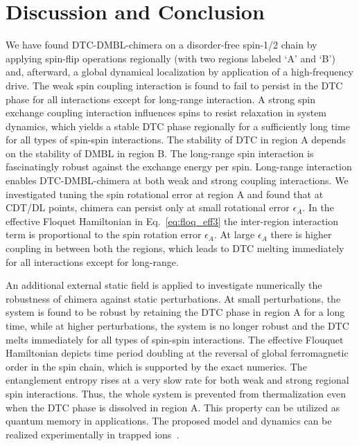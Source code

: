 \documentclass[%
nofootinbib,
reprint,
superscriptaddress,
amsmath,amssymb,showkeys,
aps,
prb,
]{revtex4-2}
\begin{document}
	
	\section{\label{sec:level7} Discussion and Conclusion}
	
	We have found DTC-DMBL-chimera on a  disorder-free spin-1/2 chain by applying spin-flip operations regionally (with two regions labeled `A' and `B') and, afterward, a global dynamical localization by application of  a high-frequency drive. The weak spin coupling interaction is found to fail to persist in the DTC phase for all interactions except for long-range interaction. A strong spin exchange coupling interaction influences spins to resist relaxation in system dynamics, which yields a stable DTC phase regionally for a sufficiently long time for all types of spin-spin interactions. The stability of DTC in region A depends on the stability of DMBL in region B. The long-range spin interaction is fascinatingly robust against the exchange energy per spin. Long-range interaction enables DTC-DMBL-chimera at both weak and strong coupling interactions. We investigated tuning the spin rotational error at region A and found that at CDT/DL points, chimera can persist only at small rotational error $\epsilon_A$. In the effective Floquet Hamiltonian in Eq.~\ref{eq:floq_eff3} the inter-region interaction term is proportional to the spin rotation error $\epsilon_A$. At large $\epsilon_A$ there is higher coupling in between both the regions, which leads to DTC melting immediately for all interactions except for long-range. 
	
	An additional external static field is applied to investigate numerically the robustness of chimera against static perturbations. At small perturbations, the system is found to be robust by retaining the DTC phase in region A for a long time, while at higher perturbations, the system is no longer robust and the DTC melts immediately for all types of spin-spin interactions. The effective Flouquet Hamiltonian depicts time period doubling at the reversal of global ferromagnetic order in the spin chain, which is supported by the exact numerics. The entanglement entropy rises at a very slow rate for both weak and strong regional spin interactions. Thus, the whole system is prevented from thermalization even when the DTC phase is dissolved in region A. This property can be utilized as quantum memory in applications. The proposed model and dynamics can be realized experimentally in trapped ions~\cite{sakurai_phys_nodate, Friedenauer2008}.
	
\end{document}
